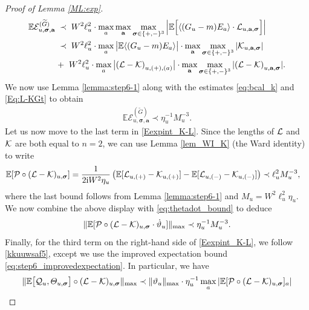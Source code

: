 \begin{proof}[Proof of Lemma \ref{ML:exp}]
\begin{align}
    \mathbb E \mathcal{E}^{(\widetilde{G})}_{u, \boldsymbol{\sigma},\textbf{a}}
   \; \prec \; & \;
W^{2}\ell_{u}^{2}\cdot  \max_a \max_{\textbf{a}}\max_{ \boldsymbol{\sigma}\in \{+,-\}^3} \Big|\mathbb E
\Big [ \langle (G_{u}-m) E_a\rangle \cdot {\cal L}_{u,\textbf{a}, \boldsymbol{\sigma} } \Big ] \Big|
 \nonumber \\
  \; \prec \; & \;
W^{2}\ell_{u}^{2}\cdot \max_a  \big|\mathbb E \langle (G_{u}-m) E_a\rangle \big|
 \cdot 
 \max_{\textbf{a}}\max_{ \boldsymbol{\sigma}\in \{+,-\}^3} |{\cal K}_{u,\textbf{a}, \boldsymbol{\sigma} }|
\nonumber \\
 + \; \;& W^{2}\ell_{u}^{2}\cdot \max_a \big|{({\cal L-\cal K})}_{u,(+), (a)} \big|
 \cdot 
 \max_{\textbf{a}} \max_{ \boldsymbol{\sigma}\in \{+,-\}^3} |{({\cal L-\cal K})}_{u,\textbf{a}, \boldsymbol{\sigma} }|.
 \end{align}
 We now use Lemma \ref{lemma:step6-1} along with the estimates \eqref{eq:bcal_k} and \eqref{Eq:L-KGt} to obtain 
 \begin{align}
     \mathbb E \mathcal{E}^{(\widetilde{G})}_{u, \boldsymbol{\sigma},\textbf{a}} \prec \eta_{u}^{-1}M_{u}^{-3}.\label{eq:wtGstep6}
 \end{align}
%
Let us now move to the last term in \eqref{Eexpint_K-L}. Since the lengths of ${\cal L}$ and ${\cal K}$ are both equal to $n=2$, we can use Lemma \ref{lem_WI_K} (the Ward identity) to write
%
\begin{align}
\mathbb{E}[{\cal P} \circ ({\cal L}-{\cal K})_{u,\boldsymbol{\sigma}}]&=\frac{1}{2\mathrm{i}W^{2}\eta_{u}}\left(\mathbb{E}[{\cal L}_{u,(+)}-{\cal K}_{u,(+)}]-\mathbb{E}[{\cal L}_{u,(-)}-{\cal K}_{u,(-)}]\right) \prec \ell_{u}^{2}M_{u}^{-3},\label{eq:step6_improvedexpectation}
\end{align}
%
where the last bound follows from Lemma \ref{lemma:step6-1} and $M_{u}=W^{2}\ell_{u}^{2}\eta_{u}$. We now combine the above display with \eqref{eq:thetadot_bound} to deduce
%
\begin{align}
\|\mathbb{E}[{\cal P}\circ ({\cal L}-{\cal K})_{u,\boldsymbol{\sigma}} \cdot \dot{\vartheta}_{u}]\|_{\max}\prec \eta_{u}^{-1}M_{u}^{-3}.\label{eq:p_term_step6}
\end{align}
%
Finally, for the third term on the right-hand side of \eqref{Eexpint_K-L}, we follow \eqref{kkuuwsaf5}, except we use the improved expectation bound \eqref{eq:step6_improvedexpectation}. In particular, we have 
%
\begin{align}
\|\E\big[{\cal Q}_u , \varTheta_{u,\boldsymbol{\sigma}} \big]\circ (\mathcal{L} - \mathcal{K}) _{u, \boldsymbol{\sigma}}\|_{\max}&\prec \|\vartheta_{u}\|_{\max}\cdot \eta_{u}^{-1}\max_{a}|\E[{\cal P} \circ ({\cal L}-{\cal K})_{u,\boldsymbol{\sigma}}]_{a}|\\

\end{align}
\end{proof}

